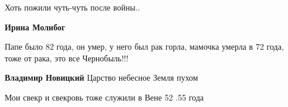  
 
 
 
 

Хоть пожили чуть-чуть после войны..

\textbf{Ирина Молибог} 

Папе было 82 года, он умер, у него был рак горла, мамочка умерла в 72 года,
тоже от рака, это все Чернобыль!!!

\textbf{Владимир Новицкий} Царство небесное Земля пухом

Мои свекр и свекровь тоже служили в Вене 52 .55 года
